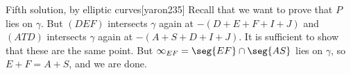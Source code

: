 \begin{customenv}{Fifth solution, by elliptic curves}[yaron235]
    Recall that we want to prove that $P$ lies on $\gamma$. But $(DEF)$ intersects $\gamma$ again at $-(D+E+F+I+J)$ and $(ATD)$ intersects $\gamma$ again at $-(A+S+D+I+J)$. It is sufficient to show that these are the same point. But $\infty_{EF}=\seg{EF}\cap\seg{AS}$ lies on $\gamma$, so $E+F=A+S$, and we are done.
\end{customenv}

